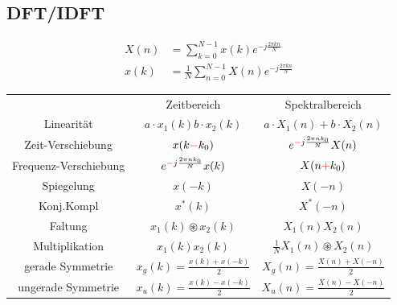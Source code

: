 \documentclass[10pt,a4paper]{article}
\begin{document}
  \subsection{DFT/IDFT}
  \begin{mdframed}[style=exercise]
    \begin{align}
        X(n)&=\sum_{k=0}^{N-1} x(k)e^{-j\frac{2\pi kn}{N}} \\
        x(k)&=\frac{1}{N}\sum_{n=0}^{N-1} X(n)e^{-j\frac{2\pi kn}{N}} 
    \end{align}
  \end{mdframed}
    \begin{center}
    \begin{tabular}{ | c | c | c | }
\cline{1-3}
        & Zeitbereich & Spektralbereich \\
\cline{1-3}
        Linearität & $a\cdot x_1(k) b\cdot x_2(k)$ & $a\cdot X_1(n) +b\cdot X_2(n)$ \\
\cline{1-3}
        Zeit-Verschiebung & $x(k\textcolor{red}{-}k_0)$ & $e^{\textcolor{red}{-}j\frac{2\pi nk_0}{N}} X(n)$\\
\cline{1-3}
        Frequenz-Verschiebung & $e^{\textcolor{red}{-}j\frac{2\pi nk_0}{N}} x(k)$ & $X(n\textcolor{red}{+}k_0)$ \\  
\cline{1-3}
        Spiegelung & $x(-k)$ & $X(-n)$ \\  
\cline{1-3}
        Konj.Kompl & $x^*(k)$& $X^*(-n)$\\ 
\cline{1-3}
        Faltung & $x_1(k) \circledast x_2(k)$ & $X_1(n)X_2(n)$ \\  
\cline{1-3}
        Multiplikation & $x_1(k)x_2(k)$ & $\frac{1}{N} X_1(n) \circledast X_2(n)$ \\
\cline{1-3}
        gerade Symmetrie & $x_g(k)=\frac{x(k)+x(-k)}{2}$ & $X_g(n)=\frac{X(n)+X(-n)}{2}$ \\
\cline{1-3}
        ungerade Symmetrie & $x_u(k)=\frac{x(k)-x(-k)}{2}$ & $X_u(n)=\frac{X(n)-X(-n)}{2}$ \\
\cline{1-3}
    \end{tabular}
    \end{center}
\end{document}
